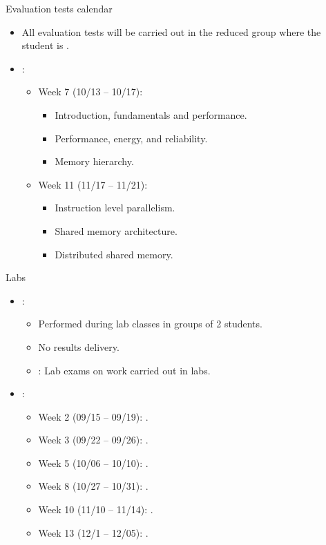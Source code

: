 \begin{frame}[t]{Evaluation tests calendar}
\begin{itemize}
  \item All evaluation tests will be carried out in the reduced group
        where the student is .

  \vfill
  \item {}:
  \begin{itemize}
    \item Week 7 (10/13 -- 10/17): 
      \begin{itemize}
        \item Introduction, fundamentals and performance.
        \item Performance, energy, and reliability.
        \item Memory hierarchy.
      \end{itemize}
    \item Week 11 (11/17 -- 11/21):
      \begin{itemize}
        \item Instruction level parallelism.
        \item Shared memory architecture.
        \item Distributed shared memory.
      \end{itemize}
  \end{itemize}
\end{itemize}
\end{frame}


\begin{frame}[t]{Labs}
\begin{itemize}
  \item {}:
    \begin{itemize}
        \item Performed during lab classes in groups of 2 students.
        \item No results delivery.
        \item {}: Lab exams on work carried out in labs.
    \end{itemize}

  \item {}:
    \begin{itemize}
      \item Week 2 (09/15 -- 09/19): .
      \item Week 3 (09/22 -- 09/26): .
      \item Week 5 (10/06 -- 10/10): .
      \item Week 8 (10/27 -- 10/31): .
      \item Week 10 (11/10 -- 11/14): .
      \item Week 13 (12/1 -- 12/05): .
    \end{itemize}
\end{itemize}
\end{frame}

